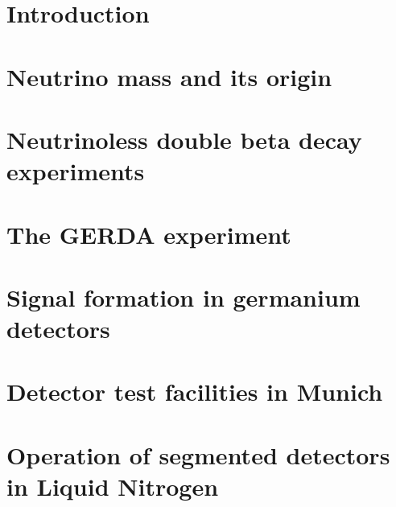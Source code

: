 \documentclass[11pt,a4paper]{book}
\begin{document}
\pagestyle{empty}



\cleardoublepage



\cleardoublepage \setcounter{page}{1} 

\tableofcontents

\cleardoublepage \setcounter{page}{1} 

\pagestyle{headings}

\chapter{Introduction}
\label{cha:intro}

\clearpage{\pagestyle{empty}\cleardoublepage}

\chapter{Neutrino mass and its origin}
\label{cha:theory}

\clearpage{\pagestyle{empty}\cleardoublepage}

\chapter{Neutrinoless double beta decay experiments}
\label{cha:exps}

\clearpage{\pagestyle{empty}\cleardoublepage}

\chapter{The GERDA experiment}
\label{cha:gerda}

\clearpage{\pagestyle{empty}\cleardoublepage}

\chapter{Signal formation in germanium detectors}
\label{cha:detector}

\clearpage{\pagestyle{empty}\cleardoublepage}

\chapter{Detector test facilities in Munich}
\label{cha:teststand}

\clearpage{\pagestyle{empty}\cleardoublepage}

\chapter{Operation of segmented detectors in Liquid Nitrogen}
\label{cha:GII}

\clearpage{\pagestyle{empty}\cleardoublepage}
\end{document}
